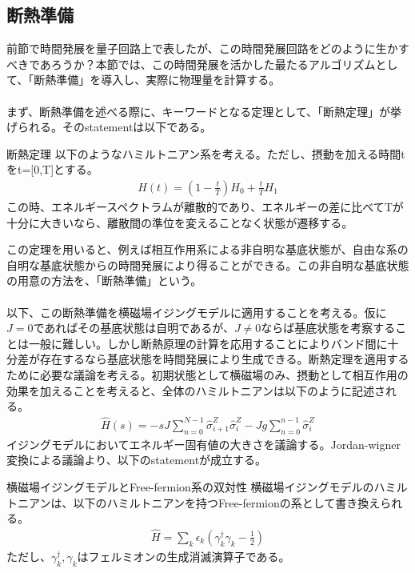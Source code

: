 \documentclass[a4paper,10.5pt]{article}
\numberwithin{equation}{section}
\begin{document}
\subsection{断熱準備}
前節で時間発展を量子回路上で表したが、この時間発展回路をどのように生かすべきであろうか？本節では、この時間発展を活かした最たるアルゴリズムとして、「断熱準備」\cite{Farhi:2000ikn}を導入し、実際に物理量を計算する。\\
\\
まず、断熱準備を述べる際に、キーワードとなる定理として、「断熱定理」が挙げられる。そのstatementは以下である。
\begin{theorembox}{断熱定理}
以下のようなハミルトニアン系を考える。ただし、摂動を加える時間tをt=[0,T]とする。
\begin{equation}\begin{split}
    H(t) = (1 - \frac{t}{T}) H_{0} + \frac{t}{T}H_{1}
\end{split} \end{equation}
この時、エネルギースペクトラムが離散的であり、エネルギーの差に比べてTが十分に大きいなら、離散間の準位を変えることなく状態が遷移する。
\end{theorembox}
この定理を用いると、例えば相互作用系による非自明な基底状態が、自由な系の自明な基底状態からの時間発展により得ることができる。この非自明な基底状態の用意の方法を、「断熱準備」という。\\
\\
以下、この断熱準備を横磁場イジングモデルに適用することを考える。仮に$J=0$であればその基底状態は自明であるが、$J\neq 0$ならば基底状態を考察することは一般に難しい。しかし断熱原理の計算を応用することによりバンド間に十分差が存在するなら基底状態を時間発展により生成できる。断熱定理を適用するために必要な議論を考える。初期状態として横磁場のみ、摂動として相互作用の効果を加えることを考えると、全体のハミルトニアンは以下のように記述される。
\begin{equation}\begin{split}
    \hat{H}(s)=-sJ\sum_{n=0}^{N-1}\hat{\sigma}_{i+1}^{Z} \hat{\sigma}_{i}^{Z} -Jg\sum_{n=0}^{n-1} \hat{\sigma}_{i}^{Z}
\end{split} \end{equation}
イジングモデルにおいてエネルギー固有値の大きさを議論する。Jordan-wigner変換による議論より、以下のstatementが成立する。
\begin{resultbox}{横磁場イジングモデルとFree-fermion系の双対性}
横磁場イジングモデルのハミルトニアンは、以下のハミルトニアンを持つFree-fermionの系として書き換えられる。
\begin{equation}\begin{split}
    \hat{H} = \sum_{k} \epsilon_{k}(\gamma^{\dagger}_{k} \gamma_{k}-\frac{1}{2})
\end{split} \end{equation}
ただし、$\gamma^{\dagger}_{k}, \gamma_{k}$はフェルミオンの生成消滅演算子である。
\end{resultbox}
\end{document}
